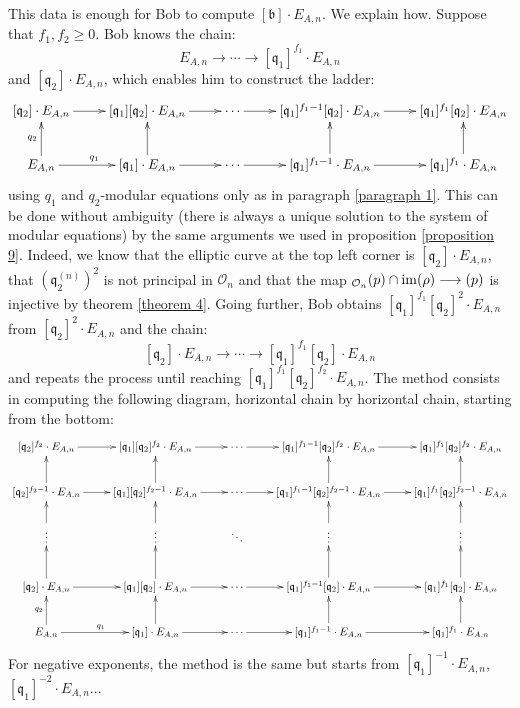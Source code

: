 \documentclass[a4paper,10pt]{report}
\theoremstyle{definition}
\theoremstyle{plain}
\theoremstyle{definition}
\newcommand{\mO}{\mathcal{O}}
\DeclareMathOperator{\im}{im}
\renewcommand{\(}{\left(}
\renewcommand{\)}{\right)}
\newcommand{\mf}[1]{\mathfrak{#1}}
\newcommand{\mfq}{\mathfrak{q}}
\let\SS\relax
\DeclareMathOperator{\SS}{SS}
\begin{document}
This data is enough for Bob to compute $[\mf{b}]\cdot E_{A,n}$. We explain how. Suppose that $f_1, f_2\geq 0$. Bob knows the chain:
\[E_{A,n}\longrightarrow \cdots \longrightarrow [\mf{q}_1]^{f_1}\cdot E_{A,n}\]
and $[\mf{q}_2]\cdot E_{A,n}$, which enables him to construct the ladder:
\[\xymatrix{
[\mf{q}_2]\cdot E_{A,n}  \ar[r] & [\mf{q}_1][\mf{q}_2]\cdot E_{A,n} \ar[r] & \cdots \ar[r] & [\mf{q}_1]^{f_1-1}[\mf{q}_2]\cdot E_{A,n} \ar[r] & [\mf{q}_1]^{f_1}[\mf{q}_2]\cdot E_{A,n}\\
E_{A,n} \ar[u]^{q_2} \ar[r]^{q_1} & [\mf{q}_1]\cdot E_{A,n} \ar[u] \ar[r] & \cdots \ar[r] & [\mf{q}_1]^{f_1-1}\cdot E_{A,n} \ar[u] \ar[r] & [\mf{q}_1]^{f_1}\cdot E_{A,n} \ar[u]
}\]
using $q_1$ and $q_2$-modular equations only as in paragraph \ref{paragraph 1}. This can be done without ambiguity (there is always a unique solution to the system of modular equations) by the same arguments we used in proposition \ref{proposition 9}. Indeed, we know that the elliptic curve at the top left corner is $[\mfq_2]\cdot E_{A,n}$, that $(\mfq_2^{(n)})^2$ is not principal in $\mO_n$ and that the map $\SS_{\mO_n}(p)\cap\im(\rho)\longrightarrow\SS(p)$ is injective by theorem \ref{theorem 4}. Going further, Bob obtains $[\mf{q}_1]^{f_1}[\mf{q}_2]^2\cdot E_{A,n}$ from $[\mf{q}_2]^2\cdot E_{A,n}$ and the chain:
\[[\mf{q}_2]\cdot E_{A,n}\longrightarrow \cdots \longrightarrow [\mf{q}_1]^{f_1}[\mf{q}_2]\cdot E_{A,n}\]
and repeats the process until reaching $[\mf{q}_1]^{f_1}[\mf{q}_2]^{f_2}\cdot E_{A,n}$. The method consists in computing the following diagram, horizontal chain by horizontal chain, starting from the bottom:
\[\xymatrix{
[\mf{q}_2]^{f_2}\cdot E_{A,n}  \ar[r] & [\mf{q}_1][\mf{q}_2]^{f_2}\cdot E_{A,n} \ar[r] & \cdots \ar[r] & [\mf{q}_1]^{f_1-1}[\mf{q}_2]^{f_2}\cdot E_{A,n} \ar[r] & [\mf{q}_1]^{f_1}[\mf{q}_2]^{f_2}\cdot E_{A,n}\\
[\mf{q}_2]^{f_2-1}\cdot E_{A,n}  \ar[u] \ar[r] & [\mf{q}_1][\mf{q}_2]^{f_2-1}\cdot E_{A,n} \ar[u] \ar[r] & \cdots \ar[r] & [\mf{q}_1]^{f_1-1}[\mf{q}_2]^{f_2-1}\cdot E_{A,n} \ar[u] \ar[r] & [\mf{q}_1]^{f_1}[\mf{q}_2]^{f_2-1}\cdot E_{A,n}\ar[u]\\
\vdots \ar[u] & \vdots \ar[u] & \ddots & \vdots \ar[u] & \vdots \ar[u]\\
[\mf{q}_2]\cdot E_{A,n}  \ar[u] \ar[r] & [\mf{q}_1][\mf{q}_2]\cdot E_{A,n} \ar[u]\ar[r] & \cdots \ar[r] & [\mf{q}_1]^{f_1-1}[\mf{q}_2]\cdot E_{A,n} \ar[u]\ar[r] & [\mf{q}_1]^{f_1}[\mf{q}_2]\cdot E_{A,n} \ar[u] \\
E_{A,n} \ar[u]^{q_2} \ar[r]^{q_1} & [\mf{q}_1]\cdot E_{A,n} \ar[u] \ar[r] & \cdots \ar[r] & [\mf{q}_1]^{f_1-1}\cdot E_{A,n} \ar[u] \ar[r] & [\mf{q}_1]^{f_1}\cdot E_{A,n} \ar[u]
}\]
For negative exponents, the method is the same but starts from $[\mf{q}_1]^{-1}\cdot E_{A,n}$, $[\mf{q}_1]^{-2}\cdot E_{A,n}$...  
\end{document}
